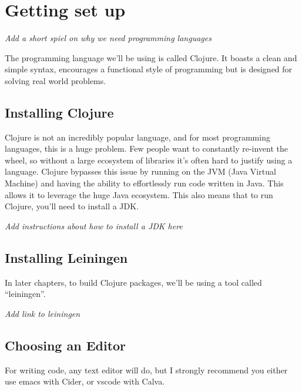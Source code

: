 \chapter{Getting set up}

{\em Add a short spiel on why we need programming languages}

The programming language we'll be using is called Clojure.  It boasts
a clean and simple syntax, encourages a functional style of
programming but is designed for solving real world problems.

\section{Installing Clojure}

Clojure is not an incredibly popular language, and for most
programming languages, this is a huge problem.  Few people want to
constantly re-invent the wheel, so without a large ecosystem of
libraries it's often hard to justify using a language.  Clojure
bypasses this issue by running on the JVM (Java Virtual Machine) and
having the ability to effortlessly run code written in Java.  This
allows it to leverage the huge Java ecosystem.  This also means that
to run Clojure, you'll need to install a JDK.

{\em Add instructions about how to install a JDK here}

\section{Installing Leiningen}

In later chapters, to build Clojure packages, we'll be using a tool
called ``leiningen''.

{\em Add link to leiningen}

\section{Choosing an Editor}
For writing code, any text editor will do, but I strongly recommend
you either use emacs with Cider, or vscode with Calva.

